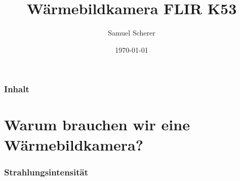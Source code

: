 \documentclass[aspectratio=169]{beamer}
\title[Wärmebildkamera]{Wärmebildkamera FLIR K53} %
\author{Samuel Scherer} %
\institute[] %
    {
    \normalsize Feuerwehr Heidelberg \\ %
    \scriptsize{Abteilung Neuenheim} \\
    \medskip
    \textit{samuel.scherer@feuerwehr-neuenheim.de} %
    }
\date{\today} %
\begin{document}
    \begin{frame}
    \titlepage %
    \end{frame}

    \begin{frame}
    \frametitle{Inhalt} %
    \tableofcontents %
    \end{frame}


    \section{Warum brauchen wir eine Wärmebildkamera?} %


    \begin{frame}
    \frametitle{Strahlungsintensität}
    \end{frame}
\end{document}
